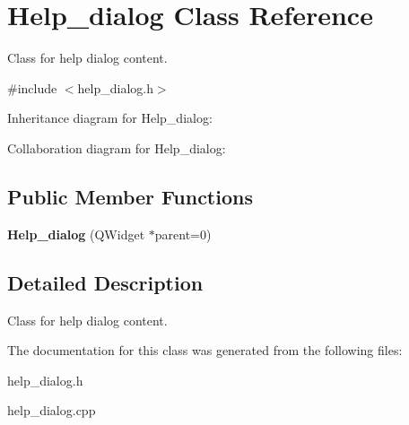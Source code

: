 \hypertarget{classHelp__dialog}{}\section{Help\+\_\+dialog Class Reference}
\label{classHelp__dialog}


Class for help dialog content.  




{\ttfamily \#include $<$help\+\_\+dialog.\+h$>$}



Inheritance diagram for Help\+\_\+dialog\+:


Collaboration diagram for Help\+\_\+dialog\+:
\subsection*{Public Member Functions}
\begin{DoxyCompactItemize}
\item 
{\bfseries Help\+\_\+dialog} (Q\+Widget $\ast$parent=0)\hypertarget{classHelp__dialog_af62361bcbec5dddb5f21e524982416ec}{}\label{classHelp__dialog_af62361bcbec5dddb5f21e524982416ec}

\end{DoxyCompactItemize}


\subsection{Detailed Description}
Class for help dialog content. 

The documentation for this class was generated from the following files\+:\begin{DoxyCompactItemize}
\item 
help\+\_\+dialog.\+h\item 
help\+\_\+dialog.\+cpp\end{DoxyCompactItemize}

